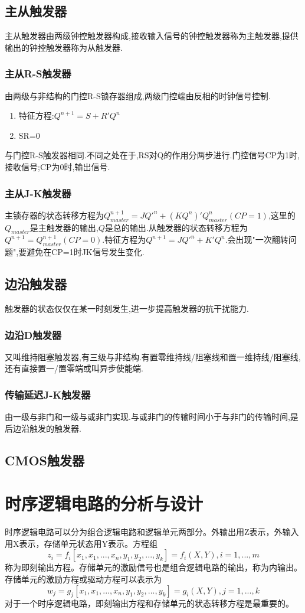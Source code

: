 \documentclass{ctexart}
\begin{document}
\subsection{主从触发器}
主从触发器由两级钟控触发器构成,接收输入信号的钟控触发器称为主触发器,提供输出的钟控触发器称为从触发器.
\subsubsection{主从R-S触发器}
由两级与非结构的门控R-S锁存器组成,两级门控端由反相的时钟信号控制.
\begin{enumerate}
    \item 特征方程:$Q^{n+1}=S+R'Q^n$
    \item SR=0
\end{enumerate}
与门控R-S触发器相同.不同之处在于,RS对Q的作用分两步进行.门控信号CP为1时,接收信号;CP为0时,输出信号.
\subsubsection{主从J-K触发器}
主锁存器的状态转移方程为$Q_{master}^{n+1}=J Q'^n+(KQ^n)'Q_{master}^n (CP=1)$,这里的$Q_{master}$是主触发器的输出,$Q$是总的输出.从触发器的状态转移方程为$Q^{n+1}=Q_{master}^{n+1} (CP=0)$.特征方程为$Q^{n+1}=J Q'^n+K'Q^n$.会出现"一次翻转问题",要避免在CP=1时JK信号发生变化.
\subsection{边沿触发器}
触发器的状态仅仅在某一时刻发生,进一步提高触发器的抗干扰能力.
\subsubsection{边沿D触发器}
又叫维持阻塞触发器,有三级与非结构.有置零维持线/阻塞线和置一维持线/阻塞线,还有直接置一/置零端或叫异步使能端.
\subsubsection{传输延迟J-K触发器}
由一级与非门和一级与或非门实现.与或非门的传输时间小于与非门的传输时间,是后边沿触发的触发器.
\subsection{CMOS触发器}

\section{时序逻辑电路的分析与设计}
时序逻辑电路可以分为组合逻辑电路和逻辑单元两部分。外输出用Z表示，外输入用X表示，存储单元状态用Y表示。方程组
\begin{equation}
    z_i=f_i[x_1,x_1,... ,x_n,y_1,y_2,... ,y_k]=f_i(X,Y),i=1,... ,m
\end{equation}
称为即刻输出方程。存储单元的激励信号也是组合逻辑电路的输出，称为内输出。存储单元的激励方程或驱动方程可以表示为
\begin{equation}
    w_j=g_j[x_1,x_1,... ,x_n,y_1,y_2,... ,y_k]=g_i(X,Y),j=1,... ,k
\end{equation}
对于一个时序逻辑电路，即刻输出方程和存储单元的状态转移方程是最重要的。
\end{document}

